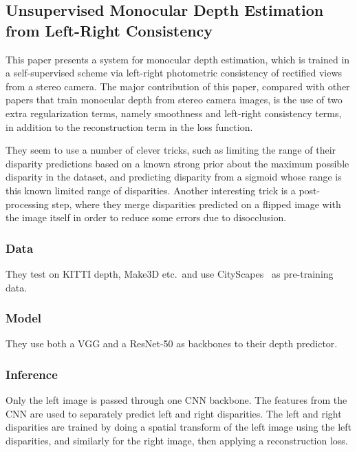 \documentclass[a4paper, 12pt]{article}
\begin{document}
\subsection{Unsupervised Monocular Depth Estimation from Left-Right
            Consistency~\citet{monodepth17}}

This paper presents a system for monocular depth estimation, which is trained
in a self-supervised scheme via left-right photometric consistency of rectified
views from a stereo camera. The major contribution of this paper, compared with
other papers that train monocular depth from stereo camera images, is the use
of two extra regularization terms, namely smoothness and left-right consistency
terms, in addition to the reconstruction term in the loss function.

They seem to use a number of clever tricks, such as limiting the range of their
disparity predictions based on a known strong prior about the maximum possible
disparity in the dataset, and predicting disparity from a sigmoid whose range
is this known limited range of disparities. Another interesting trick is a
post-processing step, where they merge disparities predicted on a flipped image
with the image itself in order to reduce some errors due to disocclusion.


\subsubsection{Data}

They test on KITTI depth, Make3D etc.\ and use
CityScapes~\cite{Cordts_2016_CVPR} as pre-training data.


\subsubsection{Model}

They use both a VGG and a ResNet-50 as backbones to their depth predictor.


\subsubsection{Inference}

Only the left image is passed through one CNN backbone. The features from the
CNN are used to separately predict left and right disparities. The left and
right disparities are trained by doing a spatial transform of the left image
using the left disparities, and similarly for the right image, then applying a
reconstruction loss.
\end{document}
